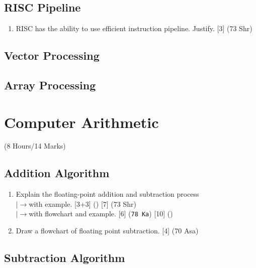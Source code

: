 \documentclass[12pt]{article}
\newcommand{\lb}{\\$\left|\rightarrow\right.$}
\begin{document}
	\subsection{RISC Pipeline}
		\begin{enumerate}
			\item RISC has the ability to use efficient instruction pipeline. Justify. \hfill [3] (73 Shr)
		\end{enumerate}

	\subsection{Vector Processing}
	\subsection{Array Processing}

	\pagebreak

\section{Computer Arithmetic}
	\begin{center}(8 Hours/14 Marks)\end{center}
	\subsection{Addition Algorithm}
	\begin{enumerate}[noitemsep, topsep=0pt]
		\item Explain the floating-point addition and subtraction process
		\lb with example. \hfill [3+3] () [7] (73 Shr)
		\lb with flowchart and example. \hfill [6] (\texttt{78 Ka}) [10] ()
		
		\item Draw a flowchart of floating point subtraction. \hfill [4] (70 Asa)
	\end{enumerate}
	\subsection{Subtraction Algorithm}
\end{document}
